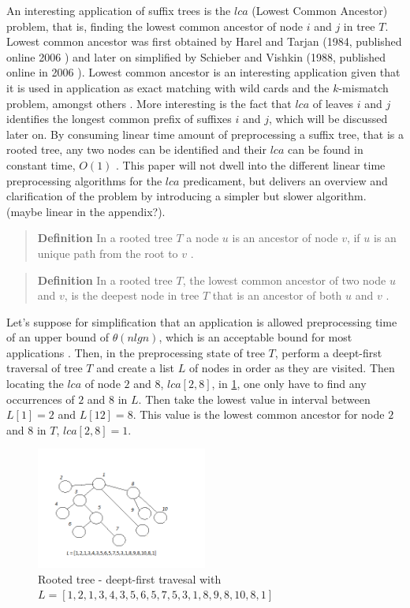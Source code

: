 \documentclass[12pt]{article} %
\begin{document}
An interesting application of suffix trees is the $lca$ (Lowest Common Ancestor) problem, that is, finding the lowest common ancestor of node $i$ and $j$ in tree $T$. 
Lowest common ancestor was first obtained by Harel and Tarjan (1984, published online 2006 \cite{lcaWeb}) and later on simplified by Schieber and Vishkin (1988, published online in 2006 \cite{lcaWebSch})\cite{gusfield}.
\newline
Lowest common ancestor is an interesting application given that it is used in application as exact matching with wild cards and the $k$-mismatch problem, amongst others \cite{gusfield}. More interesting is the fact that $lca$ of leaves $i$ and $j$ identifies the longest common prefix of suffixes $i$ and $j$, which will be discussed later on.
\newline
By consuming linear time amount of preprocessing a suffix tree, that is a rooted tree, any two nodes can be identified and their $lca$ can be found in constant time, $O(1)$ \cite{gusfield, lca}. This paper will not dwell into the different linear time preprocessing algorithms for the $lca$ predicament, but delivers an overview and clarification of the problem by introducing a simpler but slower algorithm. (maybe linear in the appendix?).
\begin{quote}
\textbf{Definition}   In a rooted tree $T$ a node $u$ is an ancestor of node $v$, if $u$ is an unique path from the root to $v$ \cite{gusfield}.
\end{quote}
\begin{quote}
\textbf{Definition}   In a rooted tree $T$, the lowest common ancestor of two node $u$ and $v$, is the deepest node in tree $T$ that is an ancestor of both $u$ and $v$ \cite{gusfield}.
\end{quote}
Let’s suppose for simplification that an application is allowed preprocessing time of an upper bound of $\theta (n lg n)$, which is an acceptable bound for most applications \cite{gusfield}. Then, in the preprocessing state of tree $T$, perform a deept-first traversal of tree $T$ and create a list $L$ of nodes in order as they are visited. Then locating the $lca$ of node $2$ and $8$, $lca[2,8]$, in \cref{fig:travesal}, one only have to find any occurrences of $2$ and $8$ in $L$. Then take the lowest value in interval between $L[1] = 2$ and $L[12]=8$. This value is the lowest common ancestor for node $2$ and $8$ in $T$, $lca[2,8]=1$.
\begin{figure}[H]
    \centering
    \includegraphics[width=0.5\textwidth]{travesal}
    \captionsetup{width=0.8\textwidth}
    \caption{Rooted tree - deept-first travesal with $L = [1,2,1,3,4,3,5,6,5,7,5,3,1,8,9,8,10,8,1]$}
    \label{fig:travesal}
\end{figure}
\end{document}

